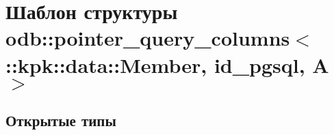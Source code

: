 \hypertarget{structodb_1_1pointer__query__columns_3_01_1_1kpk_1_1data_1_1_member_00_01id__pgsql_00_01_a_01_4}{}\section{Шаблон структуры odb\+:\+:pointer\+\_\+query\+\_\+columns$<$ \+:\+:kpk\+:\+:data\+:\+:Member, id\+\_\+pgsql, A $>$}
\label{structodb_1_1pointer__query__columns_3_01_1_1kpk_1_1data_1_1_member_00_01id__pgsql_00_01_a_01_4}
\subsection*{Открытые типы}
